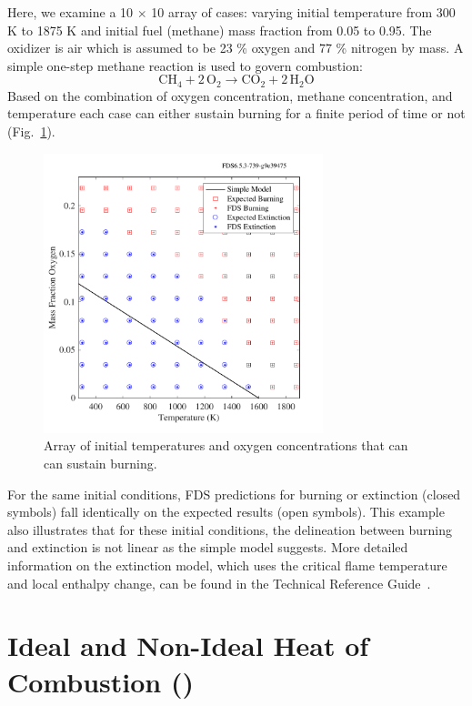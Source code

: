 \documentclass[11pt]{book}
\begin{document}
Here, we examine a 10 $\times$ 10 array of cases: varying initial temperature from 300 K to 1875 K and initial fuel (methane) mass fraction from 0.05 to 0.95. The oxidizer is air which is assumed to be 23 \% oxygen  and 77 \% nitrogen by mass. A simple one-step methane reaction is used to govern combustion:
\begin{equation}\label{eq:methane_ex}
\mathrm{CH_4 + 2\, O_2 \rightarrow  CO_2 + 2\, H_2O}
\end{equation}
Based on the combination of oxygen concentration, methane concentration, and temperature each case can either sustain burning for a finite period of time or not (Fig.~\ref{fig:extinct}).
\begin{figure}[h!]
\centering
\includegraphics[height=3.2in]{SCRIPT_FIGURES/extinction}
\caption[ model test cases]{Array of initial temperatures and oxygen concentrations that can can sustain burning.}
\label{fig:extinct}
\end{figure}
For the same initial conditions, FDS predictions for burning or extinction (closed symbols) fall identically on the expected results (open symbols). This example also illustrates that for these initial conditions, the delineation between burning and extinction is not linear as the simple model suggests. More detailed information on the extinction model, which uses the critical flame temperature and local enthalpy change, can be found in the Technical Reference Guide~\cite{FDS_Tech_Guide}.

\clearpage

\section{Ideal and Non-Ideal Heat of Combustion ()}
\label{HoC}
\label{HoC_Ideal}
\label{HoC_NonIdeal}
\end{document}
